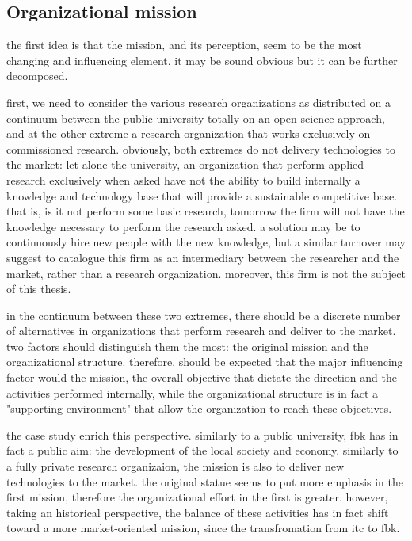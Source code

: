 \subsection{Organizational mission}

the first idea is that the mission, and its perception, seem to be the most changing and influencing element. it may be sound obvious but it can be further decomposed.

first, we need to consider the various research organizations as distributed on a continuum between the public university totally on an open science approach, and at the other extreme a research organization that works exclusively on commissioned research. obviously, both extremes do not delivery technologies to the market: let alone the university, an organization that perform applied research exclusively when asked have not the ability to build internally a knowledge and technology base that will provide a sustainable competitive base. that is, is it not perform some basic research, tomorrow the firm will not have the knowledge necessary to perform the research asked. a solution may be to continuously hire new people with the new knowledge, but a similar turnover may suggest to catalogue this firm as an intermediary between the researcher and the market, rather than a research organization. moreover, this firm is not the subject of this thesis.

in the continuum between these two extremes, there should be a discrete number of alternatives in organizations that perform research and deliver to the market. two factors should distinguish them the most: the original mission and the organizational structure. therefore, should be expected that the major influencing factor would the mission, the overall objective that dictate the direction and the activities performed internally, while the organizational structure is in fact a "supporting environment" that allow the organization to reach these objectives. 

the case study enrich this perspective. similarly to a public university, fbk has in fact a public aim: the development of the local society and economy. similarly to a fully private research organizaion, the mission is also to deliver new technologies to the market. the original statue seems to put more emphasis in the first mission, therefore the organizational effort in the first is greater. however, taking an historical perspective, the balance of these activities has in fact shift toward a more market-oriented mission, since the transfromation from itc to fbk. 

